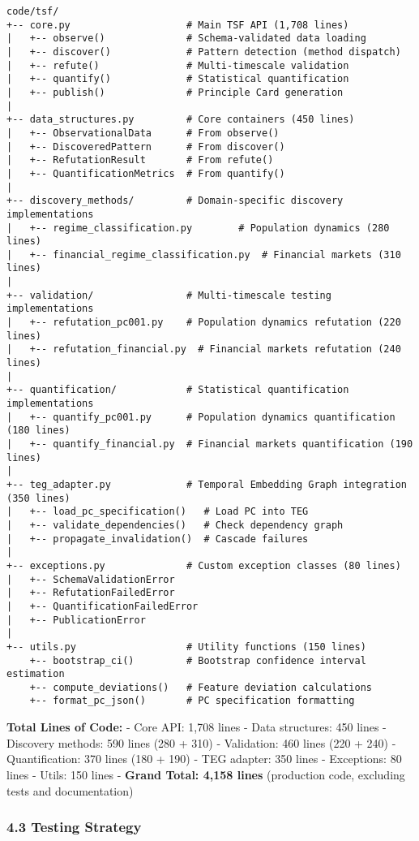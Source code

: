 \documentclass[
]{article}
\begin{document}
\begin{verbatim}
code/tsf/
+-- core.py                    # Main TSF API (1,708 lines)
|   +-- observe()              # Schema-validated data loading
|   +-- discover()             # Pattern detection (method dispatch)
|   +-- refute()               # Multi-timescale validation
|   +-- quantify()             # Statistical quantification
|   +-- publish()              # Principle Card generation
|
+-- data_structures.py         # Core containers (450 lines)
|   +-- ObservationalData      # From observe()
|   +-- DiscoveredPattern      # From discover()
|   +-- RefutationResult       # From refute()
|   +-- QuantificationMetrics  # From quantify()
|
+-- discovery_methods/         # Domain-specific discovery implementations
|   +-- regime_classification.py        # Population dynamics (280 lines)
|   +-- financial_regime_classification.py  # Financial markets (310 lines)
|
+-- validation/                # Multi-timescale testing implementations
|   +-- refutation_pc001.py    # Population dynamics refutation (220 lines)
|   +-- refutation_financial.py  # Financial markets refutation (240 lines)
|
+-- quantification/            # Statistical quantification implementations
|   +-- quantify_pc001.py      # Population dynamics quantification (180 lines)
|   +-- quantify_financial.py  # Financial markets quantification (190 lines)
|
+-- teg_adapter.py             # Temporal Embedding Graph integration (350 lines)
|   +-- load_pc_specification()   # Load PC into TEG
|   +-- validate_dependencies()   # Check dependency graph
|   +-- propagate_invalidation()  # Cascade failures
|
+-- exceptions.py              # Custom exception classes (80 lines)
|   +-- SchemaValidationError
|   +-- RefutationFailedError
|   +-- QuantificationFailedError
|   +-- PublicationError
|
+-- utils.py                   # Utility functions (150 lines)
    +-- bootstrap_ci()         # Bootstrap confidence interval estimation
    +-- compute_deviations()   # Feature deviation calculations
    +-- format_pc_json()       # PC specification formatting
\end{verbatim}

\textbf{Total Lines of Code:} - Core API: 1,708 lines - Data structures:
450 lines - Discovery methods: 590 lines (280 + 310) - Validation: 460
lines (220 + 240) - Quantification: 370 lines (180 + 190) - TEG adapter:
350 lines - Exceptions: 80 lines - Utils: 150 lines - \textbf{Grand
Total: 4,158 lines} (production code, excluding tests and documentation)

\subsubsection{4.3 Testing Strategy}\label{testing-strategy}
\end{document}
